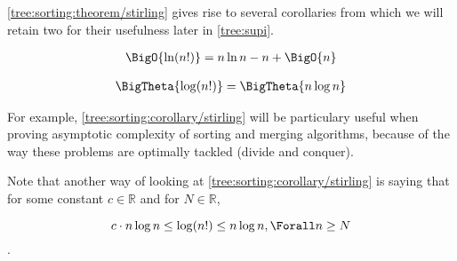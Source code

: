 \ref{tree:sorting:theorem/stirling} gives rise to several corollaries from which we will retain two for their usefulness later in \ref{tree:supi}.



\begin{corollary}
\begin{align*}
\BigO{\ln(n!)} &= n \ln n - n + \BigO{n}\\
\end{align*}
\end{corollary}



\begin{corollary}
\label{tree:sorting:corollary/stirling}
\begin{align*}
\BigTheta{\log(n!)} &= \BigTheta{n \log n}\\
\end{align*}
\end{corollary}


For example, \ref{tree:sorting:corollary/stirling} will be particulary useful when proving asymptotic complexity of sorting and merging algorithms, because of the way these problems are optimally tackled (divide and conquer).

Note that another way of looking at \ref{tree:sorting:corollary/stirling} is saying that for some constant $c \in \mathbb{R}$ and for $N \in \mathbb{R}$,


$$c \cdot n \log n \leq \log(n!) \leq n \log n, \Forall n \geq N$$.
